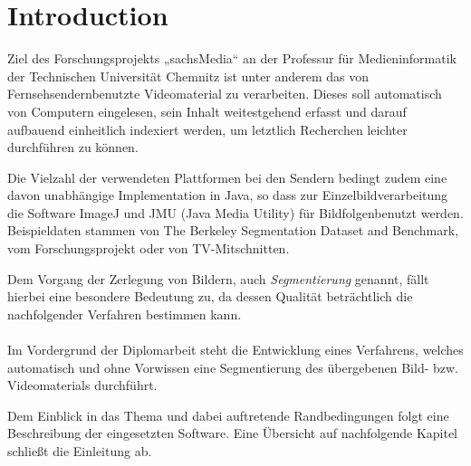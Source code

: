 \chapter{Introduction}
Ziel des Forschungsprojekts „sachsMedia“ an der Professur für Medieninformatik der Technischen Universität Chemnitz ist unter anderem das von Fernsehsendern\linebreak benutzte Videomaterial zu verarbeiten.
Dieses soll automatisch von Computern eingelesen, sein Inhalt weitestgehend erfasst und darauf aufbauend einheitlich indexiert werden, um letztlich Recherchen leichter durchführen zu können. \cite{Pressemitteilung}

Die Vielzahl der verwendeten Plattformen bei den Sendern bedingt zudem eine davon unabhängige Implementation in Java, so dass zur Einzelbildverarbeitung die Software ImageJ \cite{ImageJ} und JMU (Java Media Utility) \cite{JMU} für Bildfolgen\linebreak benutzt werden.
Beispieldaten stammen von \glqq The Berkeley Segmentation Dataset and Benchmark\grqq\space\cite{BerkeleyDB}, vom Forschungsprojekt oder von TV-Mitschnitten.

Dem Vorgang der Zerlegung von Bildern, auch \textit{Segmentierung} genannt, fällt hierbei eine besondere Bedeutung zu, da dessen Qualität beträchtlich die nachfolgender Verfahren bestimmen kann.\\ \\

\noindent Im Vordergrund der Diplomarbeit steht die Entwicklung eines Verfahrens, welches automatisch und ohne Vorwissen eine Segmentierung des übergebenen Bild- bzw. Videomaterials durchführt.

Dem Einblick in das Thema und dabei auftretende Randbedingungen folgt eine Beschreibung der eingesetzten Software. Eine Übersicht auf nachfolgende Kapitel schließt die Einleitung ab.
\pagebreak

